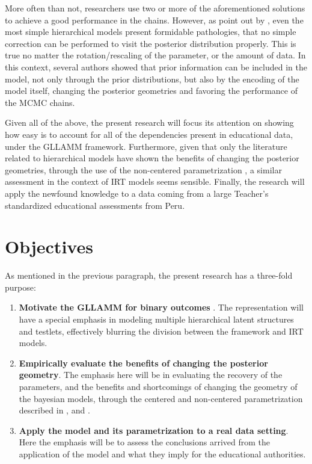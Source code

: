 More often than not, researchers use two or more of the aforementioned solutions to achieve a good performance in the chains. However, as point out by \citet{Betancourt_et_al_2013}, even the most simple hierarchical models present formidable pathologies, that no simple correction can be performed to visit the posterior distribution properly. This is true no matter the rotation/rescaling of the parameter, or the amount of data. In this context, several authors \cite{Gelfand_et_al_1995, Gelfand_et_al_1996, Papaspiliopoulos_et_al_2003, Papaspiliopoulos_et_al_2007, Betancourt_et_al_2013} showed that prior information can be included in the model, not only through the prior distributions, but also by the encoding of the model itself, changing the posterior geometries and favoring the performance of the MCMC chains.

Given all of the above, the present research will focus its attention on showing how easy is to account for all of the dependencies present in educational data, under the GLLAMM framework. Furthermore, given that only the literature related to hierarchical models have shown the benefits of changing the posterior geometries, through the use of the non-centered parametrization \cite{Gelfand_et_al_1995, Gelfand_et_al_1996, Papaspiliopoulos_et_al_2003, Papaspiliopoulos_et_al_2007, Betancourt_et_al_2013}, a similar assessment in the context of IRT models seems sensible. Finally, the research will apply the newfound knowledge to a data coming from a large Teacher's standardized educational assessments from Peru.




\section{Objectives}

As mentioned in the previous paragraph, the present research has a three-fold purpose:

\begin{enumerate}
	\item \textbf{Motivate the GLLAMM for binary outcomes} \cite{Rabe_et_al_2004a, Rabe_et_al_2004b, Skrondal_et_al_2004a, Rabe_et_al_2012}. The representation will have a special emphasis in modeling multiple hierarchical latent structures and testlets, effectively blurring the division between the framework and IRT models.
	
	\item \textbf{Empirically evaluate the benefits of changing the posterior geometry}. The emphasis here will be in evaluating the recovery of the parameters, and the benefits and shortcomings of changing the geometry of the bayesian models, through the centered and non-centered parametrization described in \citet{Gelfand_et_al_1995, Gelfand_et_al_1996, Papaspiliopoulos_et_al_2003, Papaspiliopoulos_et_al_2007}, and \citet{Betancourt_et_al_2013}.
	
	\item \textbf{Apply the model and its parametrization to a real data setting}. Here the emphasis will be to assess the conclusions arrived from the application of the model and what they imply for the educational authorities.
\end{enumerate}

